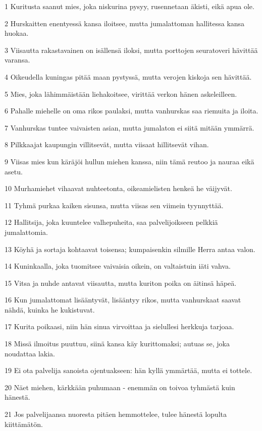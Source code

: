 \par 1 Kuritusta saanut mies, joka niskurina pysyy, rusennetaan äkisti, eikä apua ole.
\par 2 Hurskaitten enentyessä kansa iloitsee, mutta jumalattoman hallitessa kansa huokaa.
\par 3 Viisautta rakastavainen on isällensä iloksi, mutta porttojen seuratoveri hävittää varansa.
\par 4 Oikeudella kuningas pitää maan pystyssä, mutta verojen kiskoja sen hävittää.
\par 5 Mies, joka lähimmäistään liehakoitsee, virittää verkon hänen askeleilleen.
\par 6 Pahalle miehelle on oma rikos paulaksi, mutta vanhurskas saa riemuita ja iloita.
\par 7 Vanhurskas tuntee vaivaisten asian, mutta jumalaton ei siitä mitään ymmärrä.
\par 8 Pilkkaajat kaupungin villitsevät, mutta viisaat hillitsevät vihan.
\par 9 Viisas mies kun käräjöi hullun miehen kanssa, niin tämä reutoo ja nauraa eikä asetu.
\par 10 Murhamiehet vihaavat nuhteetonta, oikeamielisten henkeä he väijyvät.
\par 11 Tyhmä purkaa kaiken sisunsa, mutta viisas sen viimein tyynnyttää.
\par 12 Hallitsija, joka kuuntelee valhepuheita, saa palvelijoikseen pelkkiä jumalattomia.
\par 13 Köyhä ja sortaja kohtaavat toisensa; kumpaisenkin silmille Herra antaa valon.
\par 14 Kuninkaalla, joka tuomitsee vaivaisia oikein, on valtaistuin iäti vahva.
\par 15 Vitsa ja nuhde antavat viisautta, mutta kuriton poika on äitinsä häpeä.
\par 16 Kun jumalattomat lisääntyvät, lisääntyy rikos, mutta vanhurskaat saavat nähdä, kuinka he kukistuvat.
\par 17 Kurita poikaasi, niin hän sinua virvoittaa ja sielullesi herkkuja tarjoaa.
\par 18 Missä ilmoitus puuttuu, siinä kansa käy kurittomaksi; autuas se, joka noudattaa lakia.
\par 19 Ei ota palvelija sanoista ojentuakseen: hän kyllä ymmärtää, mutta ei tottele.
\par 20 Näet miehen, kärkkään puhumaan - enemmän on toivoa tyhmästä kuin hänestä.
\par 21 Jos palvelijaansa nuoresta pitäen hemmottelee, tulee hänestä lopulta kiittämätön.

